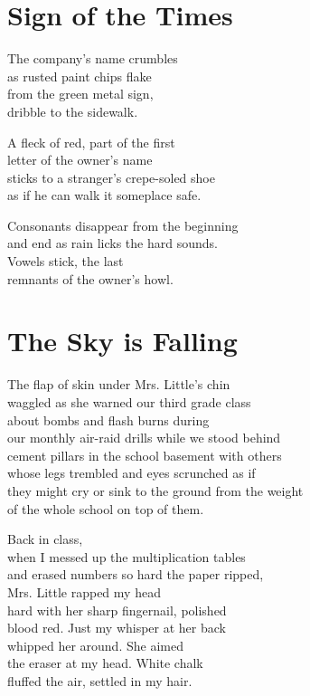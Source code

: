 \documentclass[twoside,10pt]{book}
\begin{document}
\clearpage
\section{Sign of the Times}

The company's name crumbles\\
as rusted paint chips flake\\
from the green metal sign,\\
dribble to the sidewalk.

A fleck of red, part of the first\\
letter of the owner's name\\
sticks to a stranger's crepe-soled shoe\\
as if he can walk it someplace safe.

Consonants disappear from the beginning\\
and end as rain licks the hard sounds.\\
Vowels stick, the last\\
remnants of the owner's howl.


\clearpage
\section{The Sky is Falling}

The flap of skin under Mrs. Little's chin\\
waggled as she warned our third grade class\\
about bombs and flash burns during\\
our monthly air-raid drills while we stood behind\\
cement pillars in the school basement with others\\
whose legs trembled and eyes scrunched as if\\
they might cry or sink to the ground from the weight\\
of the whole school on top of them.

Back in class,\\
when I messed up the multiplication tables\\
and erased numbers so hard the paper ripped,\\
Mrs. Little rapped my head\\
hard with her sharp fingernail, polished\\
blood red. Just my whisper at her back\\
whipped her around. She aimed\\
the eraser at my head. White chalk\\
fluffed the air, settled in my hair.
\end{document}
